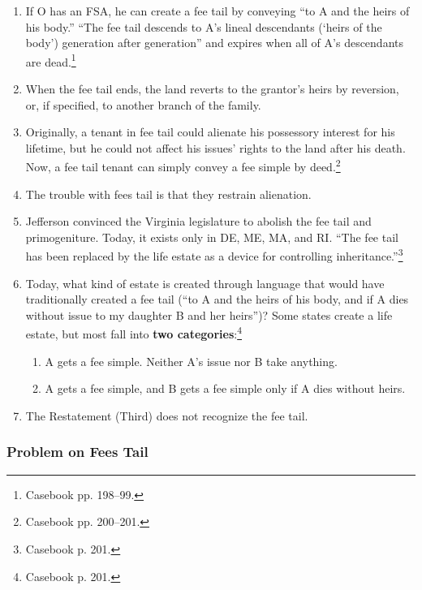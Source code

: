 \begin{enumerate}
    \item If O has an FSA, he can create a fee tail by conveying ``to A and 
    the heirs of his body.'' ``The fee tail descends to A's lineal descendants 
    (`heirs of the body') generation after generation'' and expires when all 
    of A's descendants are dead.\footnote{Casebook pp. 198--99.}
    \item When the fee tail ends, the land reverts to the grantor's heirs by 
    reversion, or, if specified, to another branch of the family.
    \item Originally, a tenant in fee tail could alienate his possessory 
    interest for his lifetime, but he could not affect his issues' rights to 
    the land after his death. Now, a fee tail tenant can simply convey a fee 
    simple by deed.\footnote{Casebook pp. 200--201.}
    \item The trouble with fees tail is that they restrain alienation.
    \item Jefferson convinced the Virginia legislature to abolish the fee tail 
    and primogeniture. Today, it exists only in DE, ME, MA, and RI. ``The fee 
    tail has been replaced by the life estate as a device for controlling 
    inheritance.''\footnote{Casebook p. 201.}
    \item Today, what kind of estate is created through language that would 
    have traditionally created a fee tail (``to A and the heirs of his 
    body, and if A dies without issue to my daughter B and her heirs'')? Some 
    states create a life estate, but most fall into \textbf{two 
    categories}:\footnote{Casebook p. 201.}
    \begin{enumerate}
        \item A gets a fee simple. Neither A's issue nor B take anything.
        \item A gets a fee simple, and B gets a fee simple only if A dies 
        without heirs.
    \end{enumerate}
    \item The Restatement (Third) does not recognize the fee tail.
\end{enumerate}

\subsubsection{Problem on Fees Tail}

